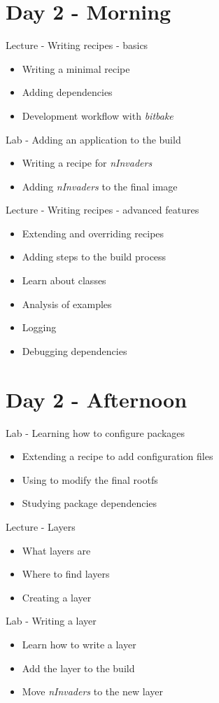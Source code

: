 \documentclass[a4paper,12pt,obeyspaces,spaces,hyphens]{article}
\begin{document}
\section{Day 2 - Morning}

\feagendatwocolumn
{Lecture - Writing recipes - basics}
{
  \begin{itemize}
  \item Writing a minimal recipe
  \item Adding dependencies
  \item Development workflow with {\em bitbake}
  \end{itemize}
}
{Lab - Adding an application to the build}
{
  \begin{itemize}
  \item Writing a recipe for {\em nInvaders}
  \item Adding {\em nInvaders} to the final image
  \end{itemize}
}

\feagendaonecolumn
{Lecture - Writing recipes - advanced features}
{
  \begin{itemize}
  \item Extending and overriding recipes
  \item Adding steps to the build process
  \item Learn about classes
  \item Analysis of examples
  \item Logging
  \item Debugging dependencies
  \end{itemize}
}

\section{Day 2 - Afternoon}

\feagendaonecolumn
{Lab - Learning how to configure packages}
{
  \begin{itemize}
  \item Extending a recipe to add configuration files
  \item Using  to modify the final rootfs
  \item Studying package dependencies
  \end{itemize}
}
\feagendatwocolumn
{Lecture - Layers}
{
  \begin{itemize}
  \item What layers are
  \item Where to find layers
  \item Creating a layer
  \end{itemize}
}
{Lab - Writing a layer}
{
  \begin{itemize}
  \item Learn how to write a layer
  \item Add the layer to the build
  \item Move {\em nInvaders} to the new layer
  \end{itemize}
}
\end{document}
